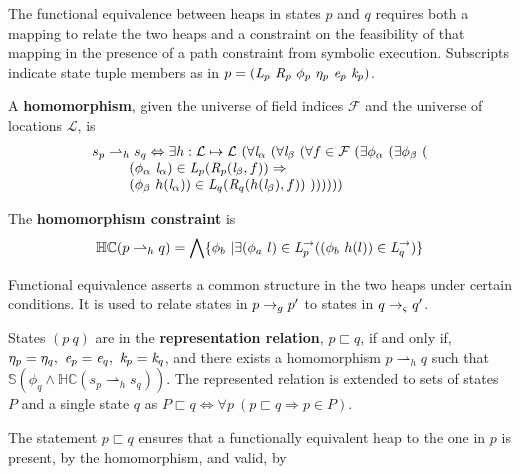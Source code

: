 The functional equivalence between heaps in states $p$
and $q$ requires both a mapping to relate the two heaps and a
constraint on the feasibility of that mapping in the presence of a
path constraint from symbolic execution. Subscripts indicate state tuple
members as in $p = (
\emph{L}_p\ \emph{R}_p\ \phi_p\ \eta_p\ \emph{e}_p\ \emph{k}_p )$.
\begin{definition}
\label{def:homomorphism}
A \textbf{homomorphism}, given the universe of field indices $\mathcal{F}$ and the universe of locations $\mathcal{L}$, is 
$$
\begin{array}{l}
 s_p \rightharpoonup_{h} s_q \Leftrightarrow 
\exists h: \mathcal{L} \mapsto \mathcal{L}\ (\forall \cfgnt{l}_\alpha\ (\forall \cfgnt{l}_\beta\ (\forall f \in \mathcal{F}\ ( \exists \phi_\alpha\ (\exists \phi_\beta\ ( \\ 
\ \ \ \ \ \ \ \ (\phi_\alpha\ \cfgnt{l}_\alpha) \in \cfgnt{L}_p(\cfgnt{R}_p (\cfgnt{l}_\beta,f )) \Rightarrow \\
\ \ \ \ \ \ \ \ (\phi_\beta\ h(\cfgnt{l}_\alpha))\in \cfgnt{L}_q(\cfgnt{R}_q (h(\cfgnt{l}_\beta),f ))\ 
 )) ) ) ) )
\end{array}
$$
\end{definition}
\begin{definition}
\label{def:hc}
The \textbf{homomorphism constraint} is
\[
\mathbb{HC}(p \rightharpoonup_{h} q) = 
\bigwedge \{ \phi_b\ | \exists (\phi_a\ l) \in \emph{L}_p^\rightarrow ( (\phi_b\ h(l)) \in \emph{L}_q^\rightarrow)\}
\]
\end{definition}
Functional equivalence asserts a common structure in the two heaps under certain
conditions. It is used to relate states in $p \rightarrow_{g}
p^\prime$ to states in $q \rightarrow_{\varsigma} q^\prime$.
\begin{definition}
\label{representation}
States $(p\ q)$ are in the \textbf{representation relation}, $p \sqsubset q$, if and only if, $\eta_p = \eta_q ,\ \cfgnt{e}_p =
\cfgnt{e}_q ,\ \cfgnt{k}_p = \cfgnt{k}_q$, and there exists a
homomorphism $p \rightharpoonup_{h} q$
such that $\mathbb{S}( \phi_q \wedge \mathbb{HC}(s_p \rightharpoonup_{h} s_q) )$.
The represented relation is extended to sets of states $P$ and a single state $q$ as
$P \sqsubset q \Longleftrightarrow \forall p\ (p \sqsubset q \Rightarrow p \in P)$.
\end{definition}
The statement $p \sqsubset q$ ensures that a functionally equivalent
heap to the one in $p$ is present, by the homomorphism, and valid, by
